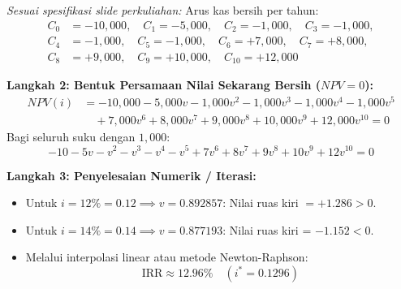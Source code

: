 \documentclass[11pt,a4paper]{article}
\begin{document}
\begin{examplebox}
\textit{Sesuai spesifikasi slide perkuliahan:}
Arus kas bersih per tahun:
\begin{align*}
    C_0 &= -10{,}000, \quad C_1 = -5{,}000, \quad C_2 = -1{,}000, \quad C_3 = -1{,}000, \\
    C_4 &= -1{,}000, \quad C_5 = -1{,}000, \quad C_6 = +7{,}000, \quad C_7 = +8{,}000, \\
    C_8 &= +9{,}000, \quad C_9 = +10{,}000, \quad C_{10} = +12{,}000
\end{align*}

\textbf{Langkah 2: Bentuk Persamaan Nilai Sekarang Bersih ($NPV = 0$):}
\begin{align*}
    NPV(i) &= -10{,}000 - 5{,}000 v - 1{,}000 v^2 - 1{,}000 v^3 - 1{,}000 v^4 - 1{,}000 v^5 \\
           &\quad + 7{,}000 v^6 + 8{,}000 v^7 + 9{,}000 v^8 + 10{,}000 v^9 + 12{,}000 v^{10} = 0
\end{align*}
Bagi seluruh suku dengan $1{,}000$:
\begin{equation*}
    -10 - 5v - v^2 - v^3 - v^4 - v^5 + 7v^6 + 8v^7 + 9v^8 + 10v^9 + 12v^{10} = 0
\end{equation*}

\textbf{Langkah 3: Penyelesaian Numerik / Iterasi:}
\begin{itemize}
    \item Untuk $i = 12\% = 0.12 \implies v = 0.892857$: Nilai ruas kiri $= +1.286 > 0$.
    \item Untuk $i = 14\% = 0.14 \implies v = 0.877193$: Nilai ruas kiri = $-1.152 < 0$.
    \item Melalui interpolasi linear atau metode Newton-Raphson:
    \begin{equation*}
        \text{IRR} \approx 12.96\% \quad (i^* = 0.1296)
    \end{equation*}
\end{itemize}


\end{examplebox}
\end{document}
